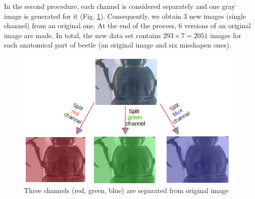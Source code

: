 \documentclass[review]{elsarticle}
\begin{document}
In the second procedure, each channel is considered separately and one gray image is generated for it (Fig. \ref{figaug2}). Consequently, we obtain 3 new images (single channel) from an original one. At the end of the process, $6$ versions of an original image are made. In total, the new data set contains $293 \times 7 = 2051$ images for each anatomical part of beetle (an original image and six misshapen ones).

\begin{figure}[h]
	\centering
	\includegraphics[scale=0.4]{images/sp_channels}
	\caption{Three channels (red, green, blue) are separated from original image}
	\label{figaug2}
\end{figure}
\end{document}
